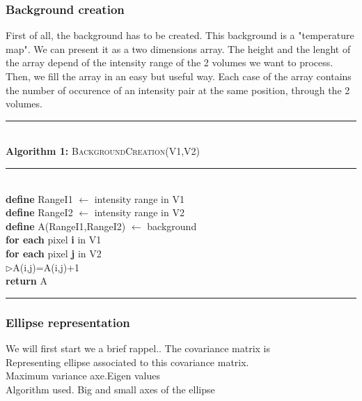 \subsubsection{Background creation}
First of all, the background has to be created. This background is a "temperature map".
We can present it as a two dimensions array. The height and the lenght of the array depend of the intensity range of the 2 volumes we want to process.
Then, we fill the array in an easy but useful way. Each 
%
case
%
of the array contains the number of occurence of an intensity pair at the same position, through the 2 volumes.

\begin{minipage}{1\textwidth}
%
\hrule
\textbf{\\Algorithm 1:} \textsc{BackgroundCreation}(V1,V2)
\hrule
\textbf{\\define}  RangeI1 $\leftarrow$  intensity range in V1\\ 
\textbf{define}  RangeI2 $\leftarrow$  intensity range in V2\\ 
\textbf{define}  A(RangeI1,RangeI2) $\leftarrow$ background\\  
%
\textbf{for each} pixel \textbf{i} in V1\\
\textbf{for each} pixel \textbf{j} in V2\\
%
$\triangleright$A(i,j)=A(i,j)+1\\
%
\textbf{return} A\\
%
\hrule
%
\end{minipage}

\subsubsection{Ellipse representation}
We will first start we a brief
%
rappel..
%
The covariance matrix is \\
Representing ellipse associated to this covariance matrix.\\
Maximum variance axe.Eigen values\\
Algorithm used.
Big and small axes of the ellipse\\
